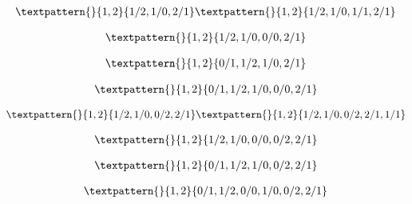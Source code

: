 \begin{equation}
	\begin{gathered}
		\textpattern{}{1,2}{1/2,1/0,2/1}
		\textpattern{}{1,2}{1/2,1/0,1/1,2/1}
	\end{gathered}
	\label{cls:47}
\end{equation}

\begin{equation}
	\begin{gathered}
		\textpattern{}{1,2}{1/2,1/0,0/0,2/1}
	\end{gathered}
	\label{cls:48}
\end{equation}

\begin{equation}
	\begin{gathered}
		\textpattern{}{1,2}{0/1,1/2,1/0,2/1}
	\end{gathered}
	\label{cls:49}
\end{equation}

\begin{equation}
	\begin{gathered}
		\textpattern{}{1,2}{0/1,1/2,1/0,0/0,2/1}
	\end{gathered}
	\label{cls:50}
\end{equation}

\begin{equation}
	\begin{gathered}
		\textpattern{}{1,2}{1/2,1/0,0/2,2/1}
		\textpattern{}{1,2}{1/2,1/0,0/2,2/1,1/1}
	\end{gathered}
	\label{cls:51}
\end{equation}

\begin{equation}
	\begin{gathered}
		\textpattern{}{1,2}{1/2,1/0,0/0,0/2,2/1}
	\end{gathered}
	\label{cls:52}
\end{equation}

\begin{equation}
	\begin{gathered}
		\textpattern{}{1,2}{0/1,1/2,1/0,0/2,2/1}
	\end{gathered}
	\label{cls:53}
\end{equation}

\begin{equation}
	\begin{gathered}
		\textpattern{}{1,2}{0/1,1/2,0/0,1/0,0/2,2/1}
	\end{gathered}
	\label{cls:54}
\end{equation}

